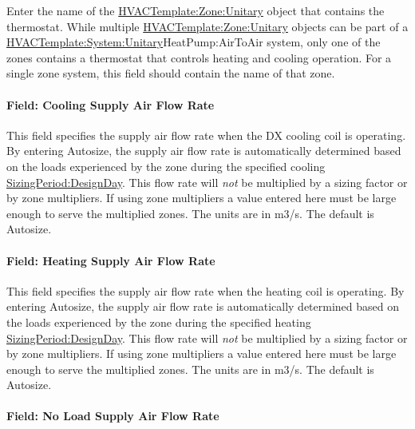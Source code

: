 Enter the name of the \hyperref[hvactemplatezoneunitary]{HVACTemplate:Zone:Unitary} object that contains the thermostat. While multiple \hyperref[hvactemplatezoneunitary]{HVACTemplate:Zone:Unitary} objects can be part of a \hyperref[hvactemplatesystemunitary]{HVACTemplate:System:Unitary}HeatPump:AirToAir system, only one of the zones contains a thermostat that controls heating and cooling operation. For a single zone system, this field should contain the name of that zone.

\paragraph{Field: Cooling Supply Air Flow Rate}\label{field-cooling-supply-air-flow-rate-4}

This field specifies the supply air flow rate when the DX cooling coil is operating. By entering Autosize, the supply air flow rate is automatically determined based on the loads experienced by the zone during the specified cooling \hyperref[sizingperioddesignday]{SizingPeriod:DesignDay}. This flow rate will \emph{not} be multiplied by a sizing factor or by zone multipliers. If using zone multipliers a value entered here must be large enough to serve the multiplied zones. The units are in m3/s. The default is Autosize.

\paragraph{Field: Heating Supply Air Flow Rate}\label{field-heating-supply-air-flow-rate-4}

This field specifies the supply air flow rate when the heating coil is operating. By entering Autosize, the supply air flow rate is automatically determined based on the loads experienced by the zone during the specified heating \hyperref[sizingperioddesignday]{SizingPeriod:DesignDay}. This flow rate will \emph{not} be multiplied by a sizing factor or by zone multipliers. If using zone multipliers a value entered here must be large enough to serve the multiplied zones. The units are in m3/s. The default is Autosize.

\paragraph{Field: No Load Supply Air Flow Rate}\label{field-no-load-supply-air-flow-rate-3}

